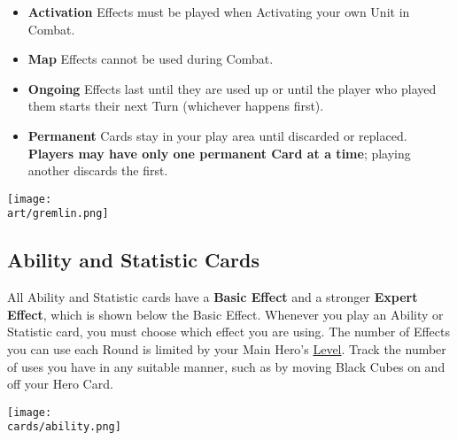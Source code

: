 \begin{multicols*}{2}
\begin{enumerate}
\begin{itemize}
    \item \textbf{Activation}  Effects must be played when Activating your own Unit in Combat.
    \item \textbf{Map}  Effects cannot be used during Combat.
    \item \textbf{Ongoing}  Effects last until they are used up or until the player who played them starts their next Turn (whichever happens first).
    \item \textbf{Permanent}  Cards stay in your play area until discarded or replaced.
      \textbf{Players may have only one permanent Card at a time}; playing another discards the first.
  \end{itemize}
\end{enumerate}

\vspace*{\fill}
\begin{center}
  \hspace{3em}
  \texttt{[image: \\art/gremlin.png]}
\end{center}

\clearpage

\subsection*{\hypertarget{Ability}{Ability and Statistic Cards}}

All Ability and Statistic cards have a \textbf{Basic Effect} and a stronger \textbf{Expert}  \textbf{Effect}, which is shown below the Basic Effect.
Whenever you play an Ability or Statistic card, you must choose which effect you are using.
The number of  Effects you can use each Round is limited by your Main Hero's \hyperlink{Level}{Level}.
Track the number of uses you have in any suitable manner, such as by moving Black Cubes on and off your Hero Card.\par
\bigskip

\texttt{[image: \\cards/ability.png]}
\bigbreak
{}


\end{multicols*}

